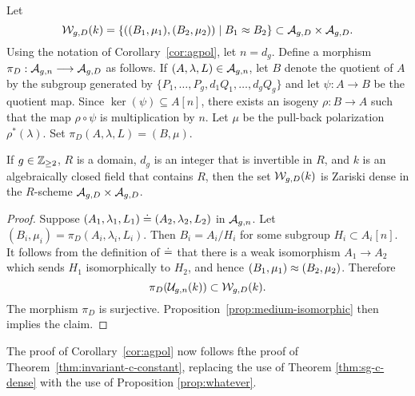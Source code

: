 \documentclass{amsart}
\begin{document}
Let
\[
\mathcal{W}_{g,D}(k) =  \{((B_1,\mu_1), (B_2, \mu_2)) \mid B_1 \approx B_2 \} \subset \mathcal{A}_{g,{D}} \times \mathcal{A}_{g,{D}}.
\]
Using the notation of Corollary~\ref{cor:agpol}, let $n = d_g$. Define a morphism %
  $\pi_D:\mathcal{A}_{g,n} \longrightarrow \mathcal{A}_{g,{D}}$
as follows. If $(A,\lambda,L) \in \mathcal{A}_{g,n}$, let $B$ denote the quotient of $A$ by the subgroup generated by $\{ P_1,\ldots,P_g,d_1Q_1,\ldots,d_gQ_g \}$ and let $\psi: A \to B$ be the quotient map. Since $\ker(\psi) \subseteq A[n]$, there exists an isogeny $\rho: B \to A$ such that the map $\rho \circ \psi$ is multiplication by $n$. Let $\mu$ be the pull-back polarization $\rho^*(\lambda)$. %
Set $\pi_D(A,\lambda,L) = (B,\mu)$.
\begin{proposition}
\label{prop:whatever}
  If $g\in\mathbb{Z}_{\ge 2}$, $R$ is a domain, $d_g$ is an integer that is invertible in $R$, and $k$ is an algebraically closed field that contains $R$, then the set $\mathcal{W}_{g,D}(k)$ is Zariski dense in the $R$-scheme $\mathcal{A}_{g,{D}} \times \mathcal{A}_{g,{D}}$.
\end{proposition}

\begin{proof}
  Suppose $(A_1, \lambda_1, L_1) \doteq (A_2, \lambda_2, L_2)$ in $\mathcal{A}_{g,n}$. Let $(B_i, \mu_i) = \pi_D(A_i, \lambda_i, L_i)$. Then $B_i = A_i/H_i$ for some subgroup $H_i \subset A_i[n]$. It follows from the definition of $\doteq$ that there is a weak isomorphism $A_1 \to A_2$ which sends $H_1$ isomorphically to $H_2$, and hence $(B_1, \mu_1) \approx (B_2, \mu_2)$. Therefore
  \[
    \pi_D(\mathcal{U}_{g,n}(k)) \subset \mathcal{W}_{g,D}(k).
  \]
  The morphism $\pi_D$ is surjective. Proposition~\ref{prop:medium-isomorphic} then implies the claim.
\end{proof}
The proof of Corollary~\ref{cor:agpol} now follows fthe proof of Theorem~\ref{thm:invariant-c-constant}, replacing the use of Theorem \ref{thm:sg-c-dense} with the use of Proposition \ref{prop:whatever}.



\end{document}
